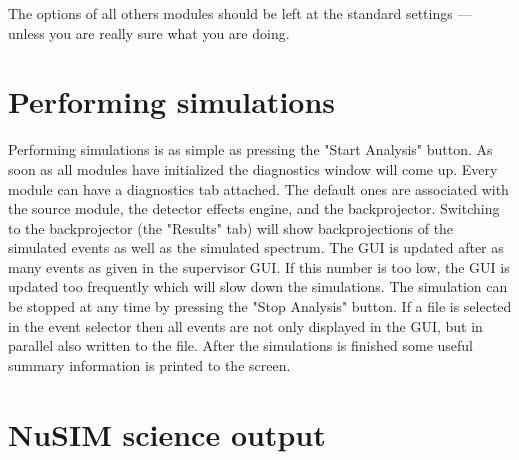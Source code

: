 The options of all others modules should be left at the standard settings --- unless you are really sure what you are doing.


\section{Performing simulations}

Performing simulations is as simple as pressing the "Start Analysis" button. 
As soon as all modules have initialized the diagnostics window will come up. 
Every module can have a diagnostics tab attached. 
The default ones are associated with the source module, the detector effects engine, and the backprojector.
Switching to the backprojector (the "Results" tab) will show backprojections of the simulated events as well as the simulated spectrum.
The GUI is updated after as many events as given in the supervisor GUI.
If this number is too low, the GUI is updated too frequently which will slow down the simulations.
The simulation can be stopped at any time by pressing the "Stop Analysis" button.
If a file is selected in the event selector then all events are not only displayed in the GUI, but in parallel also written to the file.
After the simulations is finished some useful summary information is printed to the screen.

\section{NuSIM science output}




